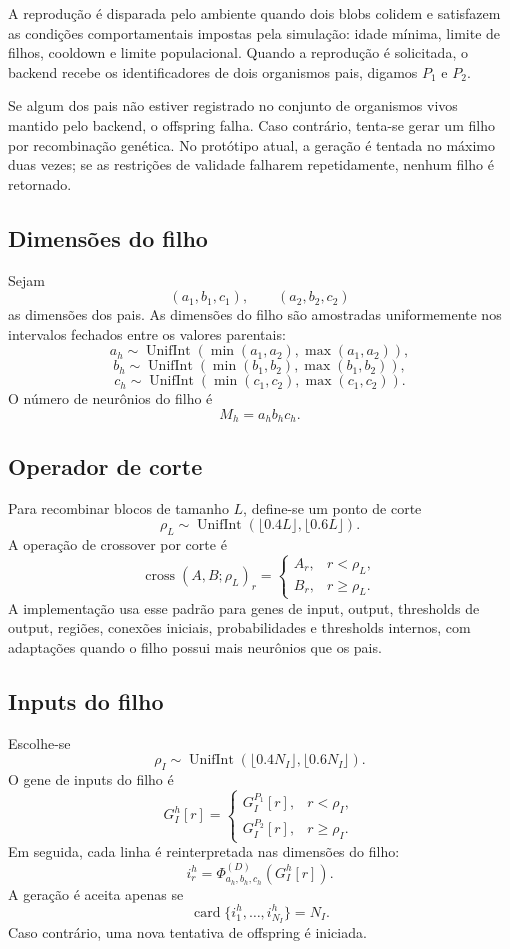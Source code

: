 \documentclass[12pt,a4paper,fleqn]{article}
\newcommand{\UnifInt}{\operatorname{UnifInt}}
\newcommand{\card}{\operatorname{card}}
\begin{document}
A reprodução é disparada pelo ambiente quando dois blobs colidem e satisfazem as condições comportamentais impostas pela simulação: idade mínima, limite de filhos, cooldown e limite populacional. Quando a reprodução é solicitada, o backend recebe os identificadores de dois organismos pais, digamos $P_1$ e $P_2$.

Se algum dos pais não estiver registrado no conjunto de organismos vivos mantido pelo backend, o offspring falha. Caso contrário, tenta-se gerar um filho por recombinação genética. No protótipo atual, a geração é tentada no máximo duas vezes; se as restrições de validade falharem repetidamente, nenhum filho é retornado.

\subsection{Dimensões do filho}

Sejam
$$
	(a_1,b_1,c_1),\qquad (a_2,b_2,c_2)
$$
as dimensões dos pais. As dimensões do filho são amostradas uniformemente nos intervalos fechados entre os valores parentais:
$$
	a_h\sim\UnifInt(\min(a_1,a_2),\max(a_1,a_2)),
$$
$$
	b_h\sim\UnifInt(\min(b_1,b_2),\max(b_1,b_2)),
$$
$$
	c_h\sim\UnifInt(\min(c_1,c_2),\max(c_1,c_2)).
$$
O número de neurônios do filho é
$$
	M_h=a_hb_hc_h.
$$

\subsection{Operador de corte}

Para recombinar blocos de tamanho $L$, define-se um ponto de corte
$$
	\rho_L\sim\UnifInt(\lfloor0.4L\rfloor,\lfloor0.6L\rfloor).
$$
A operação de crossover por corte é
$$
	\operatorname{cross}(A,B;\rho_L)_r=
	\begin{cases}
		A_r, & r<\rho_L,\\
		B_r, & r\geq\rho_L.
	\end{cases}
$$
A implementação usa esse padrão para genes de input, output, thresholds de output, regiões, conexões iniciais, probabilidades e thresholds internos, com adaptações quando o filho possui mais neurônios que os pais.

\subsection{Inputs do filho}

Escolhe-se
$$
	\rho_I\sim\UnifInt(\lfloor0.4N_I\rfloor,\lfloor0.6N_I\rfloor).
$$
O gene de inputs do filho é
$$
	G_I^h[r]=
	\begin{cases}
		G_I^{P_1}[r], & r<\rho_I,\\
		G_I^{P_2}[r], & r\geq\rho_I.
	\end{cases}
$$
Em seguida, cada linha é reinterpretada nas dimensões do filho:
$$
	i_r^h=\Phi_{a_h,b_h,c_h}^{(D)}(G_I^h[r]).
$$
A geração é aceita apenas se
$$
	\card\{i_1^h,\ldots,i_{N_I}^h\}=N_I.
$$
Caso contrário, uma nova tentativa de offspring é iniciada.
\end{document}
